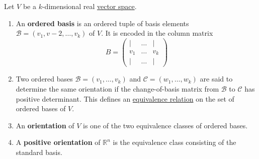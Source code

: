 	\begin{definition}
	  \label{def:orientation-of-a-vector-space}
		Let $V$ be a $k$-dimensional real \hyperref[lin-def:vector-space]{vector space}. 
		\begin{enumerate}
			\item An \textbf{ordered basis} is an ordered tuple of basis elements $\mathcal{B} = (v_1, v-2, \ldots, v_k)$ of $V$. It is encoded in the column matrix 
				\begin{equation}
					B = \begin{pmatrix} | & \ldots & | \\ v_1 & \ldots & v_k \\ | & \ldots & | \end{pmatrix}
				\end{equation}

			\item Two ordered bases $\mathcal{B} = (v_1,\dots,v_k)$ and $\mathcal{C} = (w_1,\dots,w_k)$ are said to determine the same orientation if the change-of-basis matrix from $\mathcal{B}$ to $\mathcal{C}$ has positive determinant. This defines an \hyperref[st-def:equivalence_relation]{equivalence relation} on the set of ordered bases of $V$.

			\item An \textbf{orientation} of $V$ is one of the two equivalence classes of ordered bases. 

			\item A \textbf{positive orientation} of $\mathbb{R}^n$ is the equivalence class consisting of the standard basis. 
		\end{enumerate}
	\end{definition}

